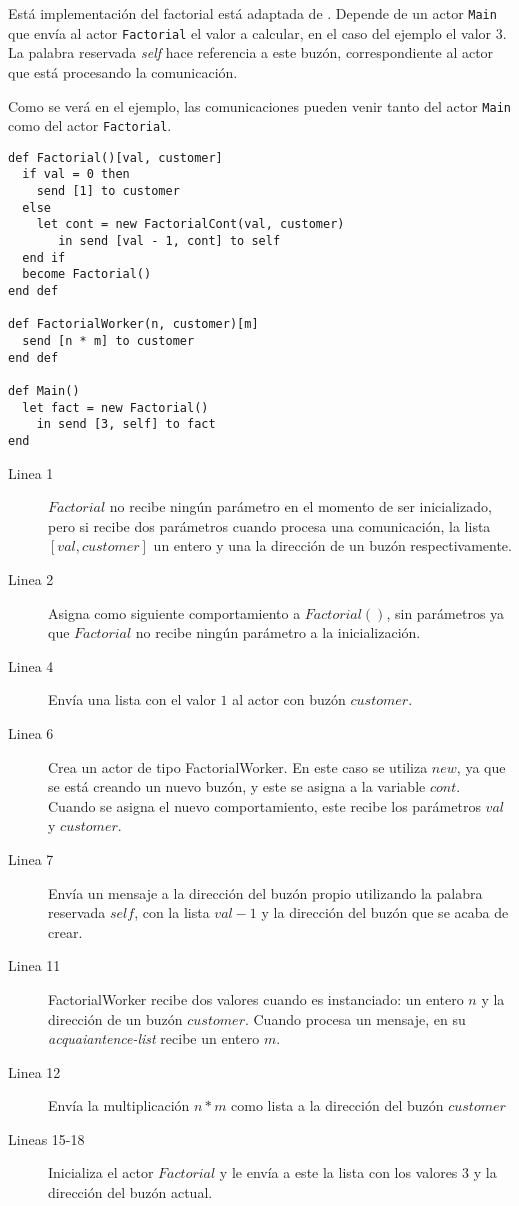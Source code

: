 Está implementación del factorial está adaptada de \cite{Agha:1986:AMC:7929}. Depende de un actor \lstinline[language=sal, style=simple]$Main$ que envía al actor \lstinline[language=sal, style=simple]$Factorial$ el valor a calcular, en el caso del ejemplo el valor $3$. La palabra reservada \textit{self} hace referencia a este buzón, correspondiente al actor que está procesando la comunicación.

Como se verá en el ejemplo, las comunicaciones pueden venir tanto del actor \lstinline[language=sal, style=simple]$Main$ como del actor \lstinline[language=sal, style=simple]$Factorial$.

\begin{lstlisting}[language=sal, style=simple]
def Factorial()[val, customer]
  if val = 0 then
    send [1] to customer
  else
    let cont = new FactorialCont(val, customer)
       in send [val - 1, cont] to self
  end if 
  become Factorial()
end def

def FactorialWorker(n, customer)[m] 
  send [n * m] to customer
end def

def Main() 
  let fact = new Factorial() 
    in send [3, self] to fact
end
\end{lstlisting}

\begin{description}

\item [Linea 1] $Factorial$ no recibe ningún parámetro en el momento de ser inicializado, pero si recibe dos parámetros cuando procesa una comunicación, la lista $[val, customer]$ un entero y una la dirección de un buzón respectivamente.
\item [Linea 2] Asigna como siguiente comportamiento a $Factorial()$, sin parámetros ya que $Factorial$ no recibe ningún parámetro a la inicialización.  
\item [Linea 4] Envía una lista con el valor $1$ al actor con buzón $customer$.
\item [Linea 6] Crea un actor de tipo FactorialWorker. En este caso se utiliza $new$, ya que se está creando un nuevo buzón, y este se asigna a la variable $cont$. Cuando se asigna el nuevo comportamiento, este recibe los parámetros $val$ y $customer$.
\item [Linea 7] Envía un mensaje a la dirección del buzón propio utilizando la palabra reservada $self$, con la lista $val - 1$ y la dirección del buzón que se acaba de crear.
\item [Linea 11] FactorialWorker recibe dos valores cuando es instanciado: un entero $n$ y la dirección de un buzón $customer$. Cuando procesa un mensaje, en su \textit{acquaiantence-list} recibe un entero $m$.
\item [Linea 12] Envía la multiplicación $n*m$ como lista a la dirección del buzón $customer$ 
\item [Lineas 15-18] Inicializa el actor $Factorial$ y le envía a este la lista con los valores $3$ y la dirección del buzón actual. 

\end{description}

